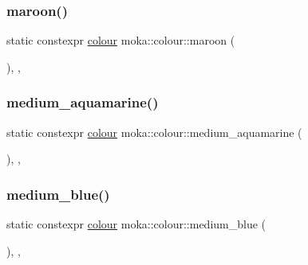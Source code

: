 \mbox{\label{classmoka_1_1colour_a7d81cd638c65e535c64adfe73fc4b91f}} 
\subsubsection{\texorpdfstring{maroon()}{maroon()}}
{\footnotesize\ttfamily static constexpr \mbox{\hyperlink{classmoka_1_1colour}{colour}} moka\+::colour\+::maroon (\begin{DoxyParamCaption}{ }\end{DoxyParamCaption})\hspace{0.3cm}{\ttfamily [inline]}, {\ttfamily [static]}, {\ttfamily [noexcept]}}

\mbox{\label{classmoka_1_1colour_a4985cc7638b3548343bf4d7bb7d0150a}} 
\subsubsection{\texorpdfstring{medium\_aquamarine()}{medium\_aquamarine()}}
{\footnotesize\ttfamily static constexpr \mbox{\hyperlink{classmoka_1_1colour}{colour}} moka\+::colour\+::medium\+\_\+aquamarine (\begin{DoxyParamCaption}{ }\end{DoxyParamCaption})\hspace{0.3cm}{\ttfamily [inline]}, {\ttfamily [static]}, {\ttfamily [noexcept]}}

\mbox{\label{classmoka_1_1colour_ac83767e582c0f0c1189958789d2e5f78}} 
\subsubsection{\texorpdfstring{medium\_blue()}{medium\_blue()}}
{\footnotesize\ttfamily static constexpr \mbox{\hyperlink{classmoka_1_1colour}{colour}} moka\+::colour\+::medium\+\_\+blue (\begin{DoxyParamCaption}{ }\end{DoxyParamCaption})\hspace{0.3cm}{\ttfamily [inline]}, {\ttfamily [static]}, {\ttfamily [noexcept]}}

